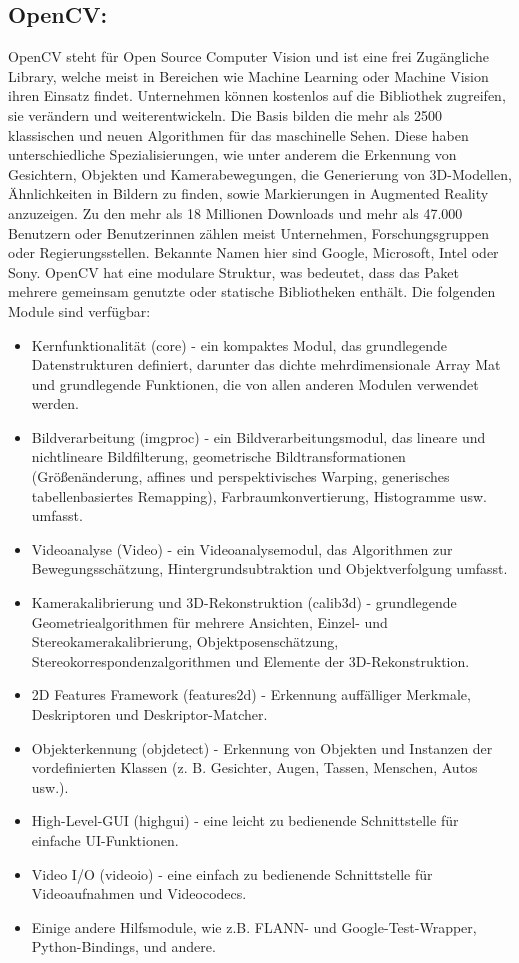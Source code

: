 \subsection{OpenCV: } OpenCV steht für Open Source Computer Vision und ist eine frei Zugängliche Library, welche meist in Bereichen wie Machine Learning oder Machine Vision ihren Einsatz findet. Unternehmen können kostenlos auf die Bibliothek zugreifen, sie verändern und weiterentwickeln. Die Basis bilden die mehr als 2500 klassischen und neuen Algorithmen für das maschinelle Sehen. Diese haben unterschiedliche Spezialisierungen, wie unter anderem die Erkennung von Gesichtern, Objekten und Kamerabewegungen, die Generierung von 3D-Modellen, Ähnlichkeiten in Bildern zu finden, sowie Markierungen in Augmented Reality anzuzeigen. Zu den mehr als 18 Millionen Downloads und mehr als 47.000 Benutzern oder Benutzerinnen zählen meist Unternehmen, Forschungsgruppen oder Regierungsstellen. Bekannte Namen hier sind Google, Microsoft, Intel oder Sony.\cite{AboutOpenCV}
OpenCV hat eine modulare Struktur, was bedeutet, dass das Paket mehrere gemeinsam genutzte oder statische Bibliotheken enthält. Die folgenden Module sind verfügbar:
\begin{itemize}
    \item Kernfunktionalität (core) - ein kompaktes Modul, das grundlegende Datenstrukturen definiert, darunter das dichte mehrdimensionale Array Mat und grundlegende Funktionen, die von allen anderen Modulen verwendet werden.
    \item Bildverarbeitung (imgproc) - ein Bildverarbeitungsmodul, das lineare und nichtlineare Bildfilterung, geometrische Bildtransformationen (Größenänderung, affines und perspektivisches Warping, generisches tabellenbasiertes Remapping), Farbraumkonvertierung, Histogramme usw. umfasst.
    \item Videoanalyse (Video) - ein Videoanalysemodul, das Algorithmen zur Bewegungsschätzung, Hintergrundsubtraktion und Objektverfolgung umfasst.
    \item Kamerakalibrierung und 3D-Rekonstruktion (calib3d) - grundlegende Geometriealgorithmen für mehrere Ansichten, Einzel- und Stereokamerakalibrierung, Objektposenschätzung, Stereokorrespondenzalgorithmen und Elemente der 3D-Rekonstruktion.
    \item 2D Features Framework (features2d) - Erkennung auffälliger Merkmale, Deskriptoren und Deskriptor-Matcher.
    \item Objekterkennung (objdetect) - Erkennung von Objekten und Instanzen der vordefinierten Klassen (z. B. Gesichter, Augen, Tassen, Menschen, Autos usw.).
    \item High-Level-GUI (highgui) - eine leicht zu bedienende Schnittstelle für einfache UI-Funktionen.
    \item Video I/O (videoio) - eine einfach zu bedienende Schnittstelle für Videoaufnahmen und Videocodecs.
    \item Einige andere Hilfsmodule, wie z.B. FLANN- und Google-Test-Wrapper, Python-Bindings, und andere.
\end{itemize}
